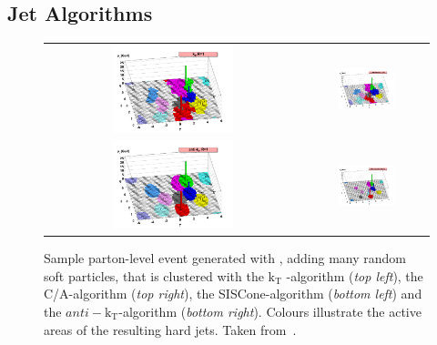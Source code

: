 \subsection{Jet Algorithms}
\label{subsec:jets_algos}
\begin{figure}[!tp]
  \centering 
  \begin{tabular}{cc}
    \includegraphics[width=0.49\textwidth]{figures/herwig-parton-level-ev-kt.png} &
    \includegraphics[width=0.49\textwidth]{figures/herwig-parton-level-ev-cam.png} \\
    \includegraphics[width=0.49\textwidth]{figures/herwig-parton-level-ev-antikt.png} &
    \includegraphics[width=0.49\textwidth]{figures/herwig-parton-level-ev-siscone.png}   
  \end{tabular}
  \caption{Sample parton-level event generated with \herwig, adding many random soft particles, that is clustered with the $\mathrm{k_T}$ -algorithm (\textit{top left}), the C/A-algorithm (\textit{top right}), the SISCone-algorithm (\textit{bottom left}) and the $anti-\mathrm{k_{T}}$-algorithm (\textit{bottom right}). Colours illustrate the active areas of the resulting hard jets. Taken from~\cite{Salam:2009jx}.}
  \label{fig:jet_algos}
\end{figure}

